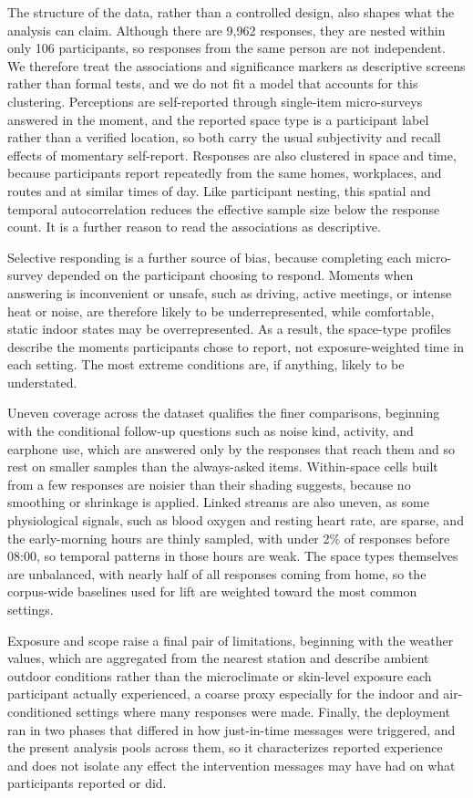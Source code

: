 \documentclass[]{interact}
\begin{document}
The structure of the data, rather than a controlled design, also shapes what the analysis can claim. Although there are 9{,}962 responses, they are nested within only 106 participants, so responses from the same person are not independent.
We therefore treat the associations and significance markers as descriptive screens rather than formal tests, and we do not fit a model that accounts for this clustering.
Perceptions are self-reported through single-item micro-surveys answered in the moment, and the reported space type is a participant label rather than a verified location, so both carry the usual subjectivity and recall effects of momentary self-report.
Responses are also clustered in space and time, because participants report repeatedly from the same homes, workplaces, and routes and at similar times of day.
Like participant nesting, this spatial and temporal autocorrelation reduces the effective sample size below the response count.
It is a further reason to read the associations as descriptive.

Selective responding is a further source of bias, because completing each micro-survey depended on the participant choosing to respond.
Moments when answering is inconvenient or unsafe, such as driving, active meetings, or intense heat or noise, are therefore likely to be underrepresented, while comfortable, static indoor states may be overrepresented.
As a result, the space-type profiles describe the moments participants chose to report, not exposure-weighted time in each setting.
The most extreme conditions are, if anything, likely to be understated.

Uneven coverage across the dataset qualifies the finer comparisons, beginning with the conditional follow-up questions such as noise kind, activity, and earphone use, which are answered only by the responses that reach them and so rest on smaller samples than the always-asked items.
Within-space cells built from a few responses are noisier than their shading suggests, because no smoothing or shrinkage is applied.
Linked streams are also uneven, as some physiological signals, such as blood oxygen and resting heart rate, are sparse, and the early-morning hours are thinly sampled, with under 2\% of responses before 08:00, so temporal patterns in those hours are weak.
The space types themselves are unbalanced, with nearly half of all responses coming from home, so the corpus-wide baselines used for lift are weighted toward the most common settings.

Exposure and scope raise a final pair of limitations, beginning with the weather values, which are aggregated from the nearest station and describe ambient outdoor conditions rather than the microclimate or skin-level exposure each participant actually experienced, a coarse proxy especially for the indoor and air-conditioned settings where many responses were made.
Finally, the deployment ran in two phases that differed in how just-in-time messages were triggered, and the present analysis pools across them, so it characterizes reported experience and does not isolate any effect the intervention messages may have had on what participants reported or did.
\end{document}

